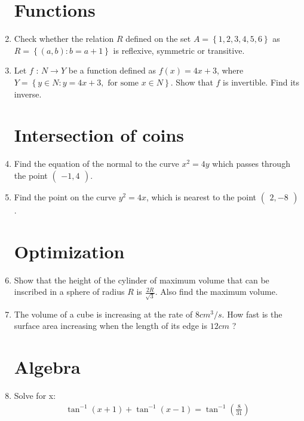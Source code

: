 \documentclass[2pt,-letter paper]{article}
\providecommand{\cbrak}[1]{\ensuremath{\left\{#1\right\}}}
\providecommand{\brak}[1]{\ensuremath{\left(#1\right)}}
\newcommand{\myvec}[1]{\ensuremath{\begin{pmatrix}#1\end{pmatrix}}}
\begin{document}
\begin{enumerate}
\section {Functions}
\item Check whether the relation $R$ defined on the set $A=\cbrak{1,2,3,4,5,6}$ as $R =\cbrak {(a, b) : b = a + 1}$ is reflexive, symmetric or transitive.
\item Let $f$ : $N\rightarrow Y $ be a function defined as $f\brak{x}= 4x + 3$, where $Y=\cbrak{y\in N:y=4x+3, \text{ for some } x\in N}$. Show that $f$ is invertible. Find its inverse.
\section{Intersection of coins}
\item Find the equation of the normal to the curve ${x}^2 = 4y$ which passes through the point $\myvec{-1,4}$.
\item Find the point on the curve ${y}^2 = 4x$, which is nearest to the point $\myvec{2,-8}$.
\section{Optimization}
\item Show that the height of the cylinder of maximum volume that can be inscribed in a sphere of radius $R$ is $\frac{2R}{\sqrt{3}}$. Also find the maximum volume.
\item The volume of a cube is increasing at the rate of $8 cm^3/s$. How fast is the surface area increasing when the length of its edge is $12 cm$ ?
\section{Algebra}
\item Solve for x:
\begin{align*}
\tan^{-1}\brak{x+1}+\tan^{-1}\brak{x-1}=\tan^{-1}\brak{\frac{8}{31}}
\end{align*}
\end{enumerate}
\end{document}
